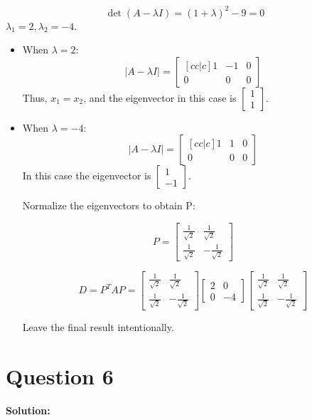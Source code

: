 \documentclass[11pt]{article} %
\begin{document}
$$\det(A-\lambda I)=(1+\lambda)^2-9=0$$
$\lambda_1=2, \lambda_2=-4$.
\begin{itemize}
	\item When $\lambda=2:$
	$$|A-\lambda I|=\begin{bmatrix}[cc|c]
		1&-1&0\\
		0&0&0
	\end{bmatrix}$$
Thus, $x_1=x_2$, and the eigenvector in this case is $\begin{bmatrix}
	1\\
	1
\end{bmatrix}$.

\item When $\lambda=-4:$
$$|A-\lambda I|=\begin{bmatrix}[cc|c]
	1&1&0\\
	0&0&0
\end{bmatrix}$$
In this case the eigenvector is $\begin{bmatrix}
	1\\-1
\end{bmatrix}$.

Normalize the eigenvectors to obtain P:

$$P=\begin{bmatrix}
	\frac{1}{\sqrt{2}}&\frac{1}{\sqrt{2}}\\
	\frac{1}{\sqrt{2}}&-\frac{1}{\sqrt{2}}
\end{bmatrix}$$

$$D=P^{T}AP=\begin{bmatrix}
	\frac{1}{\sqrt{2}}&\frac{1}{\sqrt{2}}\\
\frac{1}{\sqrt{2}}&-\frac{1}{\sqrt{2}}
\end{bmatrix}
	\begin{bmatrix}
		2&0\\
		0&-4
	\end{bmatrix}
\begin{bmatrix}
		\frac{1}{\sqrt{2}}&\frac{1}{\sqrt{2}}\\
	\frac{1}{\sqrt{2}}&-\frac{1}{\sqrt{2}}
\end{bmatrix}$$
	
Leave the final result intentionally. 
	
\end{itemize}

\section{Question 6}
\textbf{Solution:}
\end{document}
